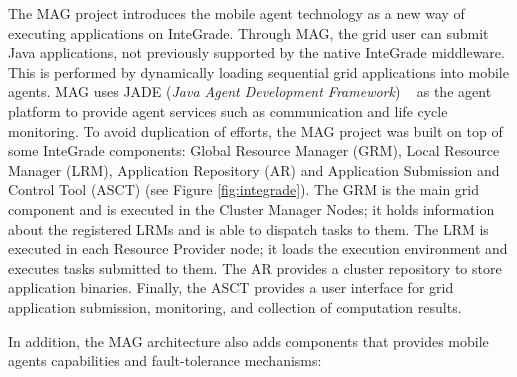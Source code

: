 \documentclass{sig-alternate}
\begin{document}
The MAG project \cite{lopes05} introduces the mobile agent technology as a new way
of executing applications on InteGrade. Through MAG, the grid user can submit
Java applications, not previously supported by the native InteGrade middleware. This is
performed by dynamically loading sequential grid applications into mobile
agents. MAG uses JADE (\emph{Java Agent Development Framework}) ~\cite{jade} as the agent
platform to provide agent services such as communication and life cycle
monitoring. 
To avoid duplication of efforts, the MAG project was built on top of
some InteGrade components: Global Resource Manager (GRM), Local Resource
Manager (LRM), Application Repository (AR) and Application Submission and
Control Tool (ASCT) (see Figure \ref{fig:integrade}). 
The GRM is the main grid component and is executed
in the Cluster Manager Nodes; it holds information about the registered
LRMs and is able to dispatch tasks to them. The LRM is executed in
each Resource Provider node; it loads the execution environment and
executes tasks submitted to them. The AR provides a cluster repository to
store application binaries. Finally, the ASCT provides a user interface for grid application submission,  
monitoring, and collection of computation results.

In addition, the MAG architecture also adds components that provides
mobile agents capabilities and fault-tolerance mechanisms:
\end{document}
